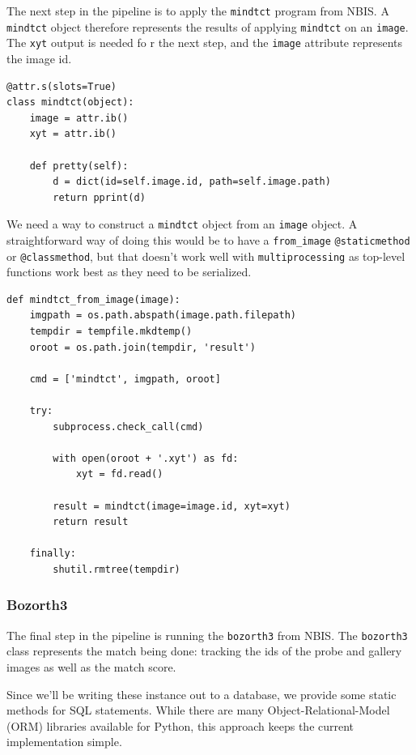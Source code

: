 The next step in the pipeline is to apply the \texttt{mindtct} program
from NBIS. A \texttt{mindtct} object therefore represents the results of
applying \texttt{mindtct} on an \texttt{image}. The \texttt{xyt} output
is needed fo r the next step, and the \texttt{image} attribute
represents the image id.

\begin{verbatim}
@attr.s(slots=True)
class mindtct(object):
    image = attr.ib()
    xyt = attr.ib()

    def pretty(self):
        d = dict(id=self.image.id, path=self.image.path)
        return pprint(d)
\end{verbatim}

We need a way to construct a \texttt{mindtct} object from an
\texttt{image} object. A straightforward way of doing this would be to
have a \texttt{from\_image} \texttt{@staticmethod} or
\texttt{@classmethod}, but that doesn't work well with
\texttt{multiprocessing} as top-level functions work best as they need
to be serialized.

\begin{verbatim}
def mindtct_from_image(image):
    imgpath = os.path.abspath(image.path.filepath)
    tempdir = tempfile.mkdtemp()
    oroot = os.path.join(tempdir, 'result')

    cmd = ['mindtct', imgpath, oroot]

    try:
        subprocess.check_call(cmd)

        with open(oroot + '.xyt') as fd:
            xyt = fd.read()

        result = mindtct(image=image.id, xyt=xyt)
        return result

    finally:
        shutil.rmtree(tempdir)
\end{verbatim}

\subsubsection{Bozorth3}\label{bozorth3}

The final step in the pipeline is running the \texttt{bozorth3} from
NBIS. The \texttt{bozorth3} class represents the match being done:
tracking the ids of the probe and gallery images as well as the match
score.

Since we'll be writing these instance out to a database, we provide some
static methods for SQL statements. While there are many
Object-Relational-Model (ORM) libraries available for Python, this
approach keeps the current implementation simple.

